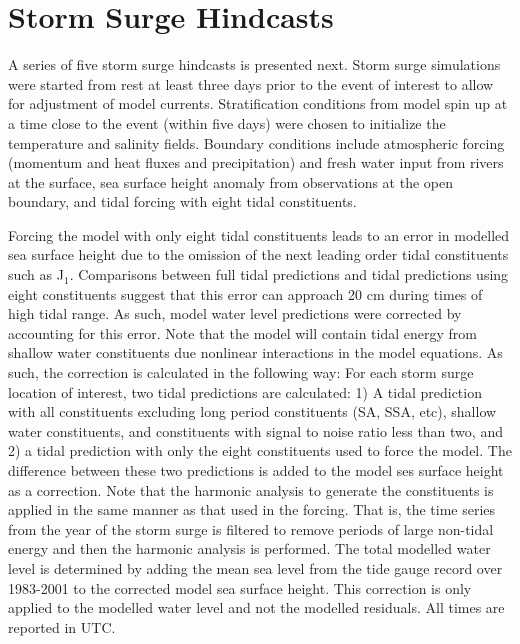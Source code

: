 \documentclass[letterpaper]{tATO2e}
\begin{document}
\section{Storm Surge Hindcasts}\label{sec:storm}
A series of five storm surge hindcasts is presented next. Storm surge simulations were started from rest at least three days prior to the event of interest to allow for adjustment of model currents. Stratification conditions from model spin up at a time close to the event (within five days) were chosen to initialize the temperature and salinity fields. {\color{red} Boundary conditions include atmospheric forcing (momentum and heat fluxes and precipitation) and fresh water input from rivers at the surface, sea surface height anomaly from observations at the open boundary, and tidal forcing with eight tidal constituents.} 


Forcing the model with only eight tidal constituents leads to an error in modelled sea surface height due to the omission of the next leading order tidal constituents such as J$_1$. Comparisons between full tidal predictions and tidal predictions using eight constituents suggest that this error can approach {\color{red} 20} cm during times of high tidal range. {\color{red} As such, model water level predictions were corrected by accounting for this error. Note that the model will contain tidal energy from shallow water constituents due nonlinear interactions in the model equations. As such, the correction is calculated in the following way:  For each storm surge location of interest, two tidal predictions are calculated: 1) A tidal prediction with all constituents excluding long period constituents (SA, SSA, etc), shallow water constituents, and constituents with signal to noise ratio less than two, and 2) a tidal prediction with only the eight constituents used to force the model.  The difference between these two predictions is added to the model ses surface height as a correction. Note that the harmonic analysis to generate the constituents is applied in the same manner as that used in the forcing. That is, the time series from the year of the storm surge is filtered to remove periods of large non-tidal energy and then the harmonic analysis is performed. The total modelled water level is determined by adding the mean sea level from the tide gauge record over 1983-2001 to the corrected model sea surface height.} This correction is only applied to the modelled water level and not the modelled residuals. All times are reported in UTC.
\end{document}
